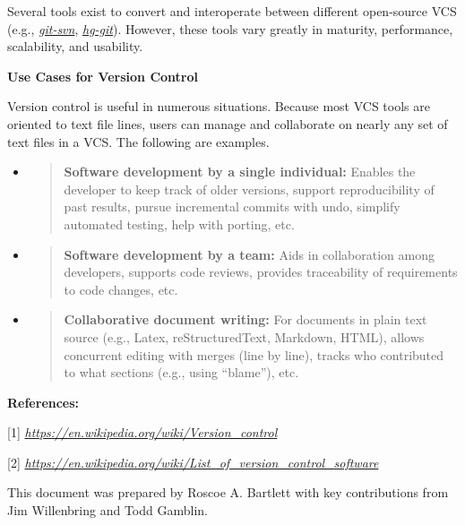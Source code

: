 \documentclass[]{article}
\begin{document}
Several tools exist to convert and interoperate between different
open-source VCS (e.g.,
\href{https://www.kernel.org/pub/software/scm/git/docs/v1.5.0/git-svn.html}{\emph{git-svn}},
\href{https://www.mercurial-scm.org/wiki/HgGit}{\emph{hg-git}}).
However, these tools vary greatly in maturity, performance, scalability,
and usability.

\textbf{Use Cases for Version Control}

Version control is useful in numerous situations. Because most VCS tools
are oriented to text file lines, users can manage and collaborate on
nearly any set of text files in a VCS. The following are examples.

\begin{itemize}
\item
  \begin{quote}
  \textbf{Software development by a single individual:} Enables the
  developer to keep track of older versions, support reproducibility of
  past results, pursue incremental commits with undo, simplify automated
  testing, help with porting, etc.
  \end{quote}
\item
  \begin{quote}
  \textbf{Software development by a team:} Aids in collaboration among
  developers, supports code reviews, provides traceability of
  requirements to code changes, etc.
  \end{quote}
\item
  \begin{quote}
  \textbf{Collaborative document writing:} For documents in plain text
  source (e.g., Latex, reStructuredText, Markdown, HTML), allows
  concurrent editing with merges (line by line), tracks who contributed
  to what sections (e.g., using ``blame''), etc.
  \end{quote}
\end{itemize}

\protect\hypertarget{h.9qg5mj337055}{}{}\textbf{References:}

\protect\hypertarget{h.zeieakqm2nff}{}{\protect\hypertarget{id.hbymvf6o75jy}{}{}}{[}1{]}
\href{https://en.wikipedia.org/wiki/Version_control}{\emph{https://en.wikipedia.org/wiki/Version\_control}}

\protect\hypertarget{h.f53m6pxt4rgc}{}{\protect\hypertarget{id.701ggrsblayp}{}{}}{[}2{]}
\href{https://en.wikipedia.org/wiki/List_of_version_control_software}{\emph{https://en.wikipedia.org/wiki/List\_of\_version\_control\_software}}

This document was prepared by Roscoe A. Bartlett with key contributions
from Jim Willenbring and Todd Gamblin.
\end{document}
